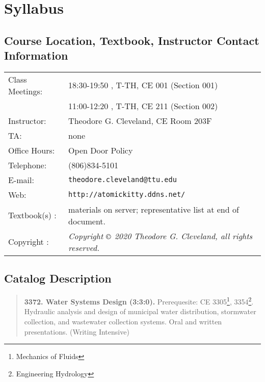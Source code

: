 \documentclass[12pt]{article}
\begin{document}
\section*{Syllabus}

\subsection*{{Course Location, Textbook, Instructor Contact Information}}
\begin{tabular}{p{1.5in}p{5.0in}}
Class Meetings:  &    18:30-19:50 , T-TH, CE 001 (Section 001) \\
~ &    11:00-12:20 , T-TH, CE 211 (Section 002) \\
Instructor: & Theodore G. Cleveland, CE Room 203F \\
TA: & none \\
Office Hours: & Open Door Policy \\
Telephone: & (806)834-5101 \\
E-mail: & \texttt{theodore.cleveland@ttu.edu}\\
Web: & \texttt{http://atomickitty.ddns.net/} \\
Textbook(s) : &  materials on server; representative list at end of document. \\ 
Copyright : & \textsl{Copyright $\copyright$ 2020 Theodore G. Cleveland, all rights reserved.} \\
\end{tabular}
\subsection*{{Catalog Description}}
\begin{quote} \textbf{3372. Water Systems Design (3:3:0).}  Prerequesite: CE 3305\footnote{Mechanics of Fluids}, 3354\footnote{Engineering Hydrology}.  Hydraulic analysis and design of municipal water distribution, stormwater collection, and wastewater collection systems.  Oral and written presentations. (Writing Intensive)
\end{quote}
\end{document}
